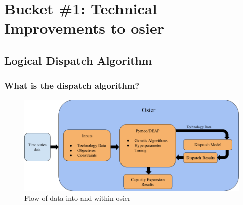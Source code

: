 \section{Bucket \#1: Technical Improvements to \gls{osier}}

\subsection{Logical Dispatch Algorithm}

\begin{frame}
    \frametitle{What is the dispatch algorithm?}

    \begin{figure}
        \centering
        \includegraphics[width=\columnwidth]{../docs/figures/03_osier_chapter/osier_flow.png}
        \caption{Flow of data into and within \gls{osier}}
        \label{fig:osier-flow}
    \end{figure}

\end{frame}

